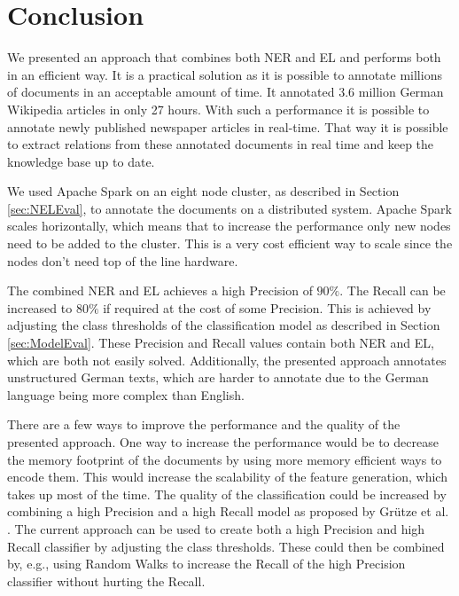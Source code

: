 \section{Conclusion}
\label{sec:Conclusion}
We presented an approach that combines both NER and EL and performs both in an efficient way. It is a practical solution as it is possible to annotate millions of documents in an acceptable amount of time. It annotated 3.6 million German Wikipedia articles in only 27 hours. With such a performance it is possible to annotate newly published newspaper articles in real-time. That way it is possible to extract relations from these annotated documents in real time and keep the knowledge base up to date.\par
We used Apache Spark on an eight node cluster, as described in Section \ref{sec:NELEval}, to annotate the documents on a distributed system. Apache Spark scales horizontally, which means that to increase the performance only new nodes need to be added to the cluster. This is a very cost efficient way to scale since the nodes don't need top of the line hardware.\par
The combined NER and EL achieves a high Precision of $90\%$. The Recall can be increased to $80\%$ if required at the cost of some Precision. This is achieved by adjusting the class thresholds of the classification model as described in Section \ref{sec:ModelEval}. These Precision and Recall values contain both NER and EL, which are both not easily solved. Additionally, the presented approach annotates unstructured German texts, which are harder to annotate due to the German language being more complex than English.\par
There are a few ways to improve the performance and the quality of the presented approach. One way to increase the performance would be to decrease the memory footprint of the documents by using more memory efficient ways to encode them. This would increase the scalability of the feature generation, which takes up most of the time. The quality of the classification could be increased by combining a high Precision and a high Recall model as proposed by Grütze et al. \cite{coheel}. The current approach can be used to create both a high Precision and high Recall classifier by adjusting the class thresholds. These could then be combined by, e.g., using Random Walks to increase the Recall of the high Precision classifier without hurting the Recall.
